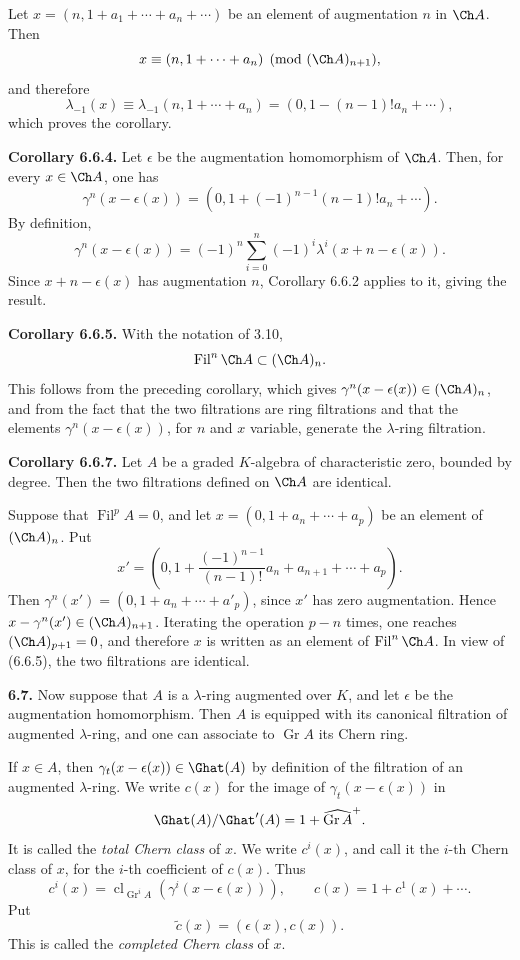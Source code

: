 \documentclass[11pt]{article}
\newcommand{\Gr}{\operatorname{Gr}}
\newcommand{\Fil}{\operatorname{Fil}}
\newcommand{\cl}{\operatorname{cl}}
\providecommand{\Gr}{\operatorname{Gr}}
\providecommand{\Gr}{\operatorname{G}}
\begin{document}
Let \(x=(n,1+a_1+\cdots+a_n+\cdots)\) be an element of augmentation \(n\) in \(\Ch A\). Then
\[
  x\equiv (n,1+\cdots+a_n)\pmod{(\Ch A)_{n+1}},
\]
and therefore
\[
  \lambda_{-1}(x)\equiv \lambda_{-1}(n,1+\cdots+a_n)
  =(0,1-(n-1)!a_n+\cdots),
\]
which proves the corollary.

\textbf{Corollary 6.6.4.} Let \(\epsilon\) be the augmentation homomorphism of \(\Ch A\). Then, for every \(x\in\Ch A\), one has
\[
  \gamma^n(x-\epsilon(x))
  =
  (0,1+(-1)^{n-1}(n-1)!a_n+\cdots).
\]
By definition,
\[
  \gamma^n(x-\epsilon(x))
  =
  (-1)^n\sum_{i=0}^n(-1)^i\lambda^i(x+n-\epsilon(x)).
\]
Since \(x+n-\epsilon(x)\) has augmentation \(n\), Corollary 6.6.2 applies to it, giving the result.

\textbf{Corollary 6.6.5.} With the notation of 3.10,
\[
  \Fil^n\Ch A\subset(\Ch A)_n.
\]
This follows from the preceding corollary, which gives \(\gamma^n(x-\epsilon(x))\in(\Ch A)_n\), and from the fact that the two filtrations are ring filtrations and that the elements \(\gamma^n(x-\epsilon(x))\), for \(n\) and \(x\) variable, generate the \(\lambda\)-ring filtration.

\textbf{Corollary 6.6.7.} Let \(A\) be a graded \(K\)-algebra of characteristic zero, bounded by degree. Then the two filtrations defined on \(\Ch A\) are identical.

Suppose that \(\Fil^p A=0\), and let \(x=(0,1+a_n+\cdots+a_p)\) be an element of \((\Ch A)_n\). Put
\[
  x'=\left(0,1+\frac{(-1)^{n-1}}{(n-1)!}a_n+a_{n+1}+\cdots+a_p\right).
\]
Then \(\gamma^n(x')=(0,1+a_n+\cdots+a'_p)\), since \(x'\) has zero augmentation. Hence \(x-\gamma^n(x')\in(\Ch A)_{n+1}\). Iterating the operation \(p-n\) times, one reaches \((\Ch A)_{p+1}=0\), and therefore \(x\) is written as an element of \(\Fil^n\Ch A\). In view of (6.6.5), the two filtrations are identical.

\textbf{6.7.} Now suppose that \(A\) is a \(\lambda\)-ring augmented over \(K\), and let \(\epsilon\) be the augmentation homomorphism. Then \(A\) is equipped with its canonical filtration of augmented \(\lambda\)-ring, and one can associate to \(\Gr A\) its Chern ring.

If \(x\in A\), then \(\gamma_t(x-\epsilon(x))\in\Ghat(A)\) by definition of the filtration of an augmented \(\lambda\)-ring. We write \(c(x)\) for the image of \(\gamma_t(x-\epsilon(x))\) in
\[
  \Ghat(A)/\Ghat'(A)=1+\widehat{\Gr A}^{+}.
\]
It is called the \emph{total Chern class} of \(x\). We write \(c^i(x)\), and call it the \(i\)-th Chern class of \(x\), for the \(i\)-th coefficient of \(c(x)\). Thus
\begin{equation}\tag{6.7.1}
  c^i(x)=\cl_{\Gr^iA}\!\left(\gamma^i(x-\epsilon(x))\right),
  \qquad
  c(x)=1+c^1(x)+\cdots .
\end{equation}
Put
\begin{equation}\tag{6.7.2}
  \widetilde c(x)=(\epsilon(x),c(x)).
\end{equation}
This is called the \emph{completed Chern class} of \(x\).
\end{document}
